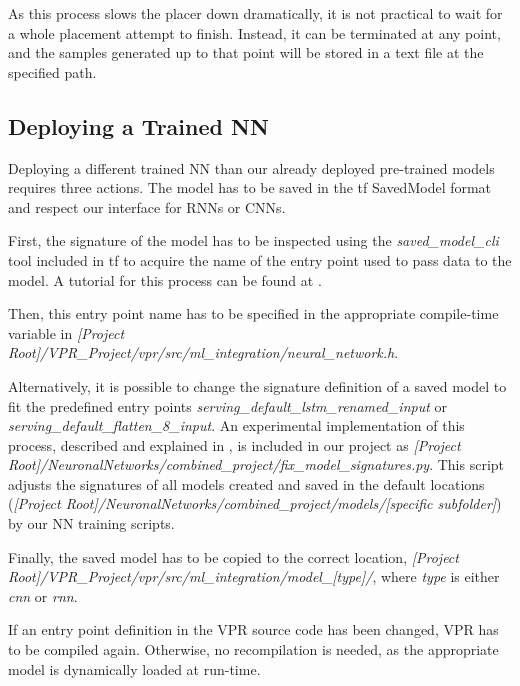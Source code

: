As this process slows the placer down dramatically, it is not practical to wait for a whole placement attempt to finish. Instead, it can be terminated at any point, and the samples generated up to that point will be stored in a text file at the specified path.

\subsection{Deploying a Trained \gls{NN}}

Deploying a different trained \gls{NN} than our already deployed pre-trained models requires three actions. The model has to be saved in the \gls{tf} SavedModel format and respect our interface for \glspl{RNN} or \glspl{CNN}.

First, the signature of the model has to be inspected using the \textit{saved\_model\_cli} tool included in \gls{tf} to acquire the name of the entry point used to pass data to the model. A tutorial for this process can be found at \cite{tf-inspect-savedmodel}.

Then, this entry point name has to be specified in the appropriate compile-time variable in \textit{[Project Root]/VPR\_Project/vpr/src/ml\_integratio}\linebreak\noindent \textit{n/neural\_network.h}.

Alternatively, it is possible to change the signature definition of a saved model to fit the predefined entry points \textit{serving\_default\_lstm\_rena}\linebreak\noindent \textit{med\_input} or \textit{serving\_default\_flatten\_8\_input}. An experimental implementation of this process, described and explained in \cite{rename-savedmodel}, is included in our project as \textit{[Project Root]/NeuronalNetworks/combined\_project/fix\_mo}\linebreak\noindent \textit{del\_signatures.py}. This script adjusts the signatures of all models created and saved in the default locations (\textit{[Project Root]/NeuronalNetworks/com}\linebreak\noindent \textit{bined\_project/models/[specific subfolder]}) by our \gls{NN} training scripts.

Finally, the saved model has to be copied to the correct location, \textit{[Project Root]/VPR\_Project/vpr/src/ml\_integration/model\_[type]/}, where \textit{type} is either \textit{cnn} or \textit{rnn}.

If an entry point definition in the \gls{VPR} source code has been changed, \gls{VPR} has to be compiled again. Otherwise, no recompilation is needed, as the appropriate model is dynamically loaded at run-time.

